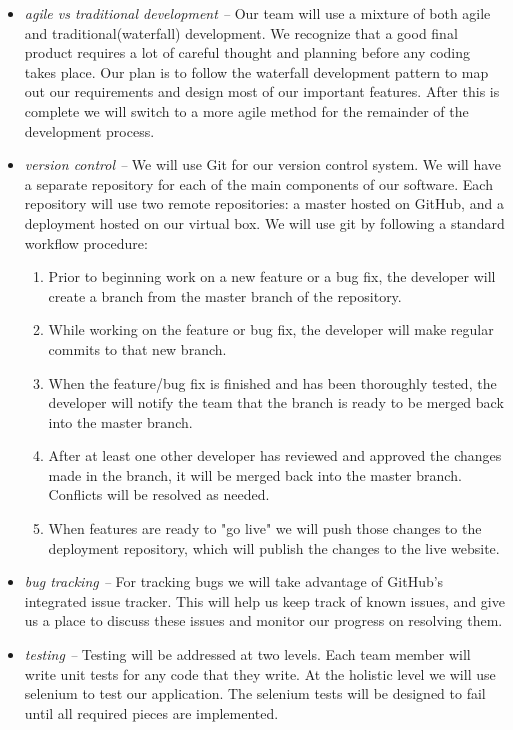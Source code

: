 \documentclass{extarticle}
\begin{document}
\begin{itemize}
\item \emph{agile vs traditional development -- } Our team will use a mixture of both agile and traditional(waterfall)
development. We recognize that a good final product requires a lot of careful thought and planning before any coding
takes place. Our plan is to follow the waterfall development pattern to map out our requirements and design most of
our important features. After this is complete we will switch to a more agile method for the remainder of the
development process.
\item \emph{version control -- }We will use Git for our version control system.  We will have a separate repository
for each of the main components of our software.  Each repository will use two remote repositories: a master hosted
on GitHub, and a deployment hosted on our virtual box.  We will use git by following a standard workflow procedure:
\begin{enumerate}
\item Prior to beginning work on a new feature or a bug fix, the developer will create a branch from the master
branch of the repository.
\item While working on the feature or bug fix, the developer will make regular commits to that new branch.
\item When the feature/bug fix is finished and has been thoroughly tested, the developer will notify the team that
the branch is ready to be merged back into the master branch.
\item After at least one other developer has reviewed and approved the changes made in the branch, it will be
merged back into the master branch.  Conflicts will be resolved as needed.
\item When features are ready to "go live" we will push those changes to the deployment repository, which will
publish the changes to the live website.
\end{enumerate}
\item \emph{bug tracking -- }For tracking bugs we will take advantage of GitHub's integrated issue tracker.  This
will help us keep track of known issues, and give us a place to discuss these issues and monitor our progress on
resolving them.
\item \emph{testing -- }Testing will be addressed at two levels.  Each team member will write unit tests for any
code that they write.  At the holistic level we will use selenium to test our application.  The selenium tests will
be designed to fail until all required pieces are implemented.

\end{itemize}
\end{document}
